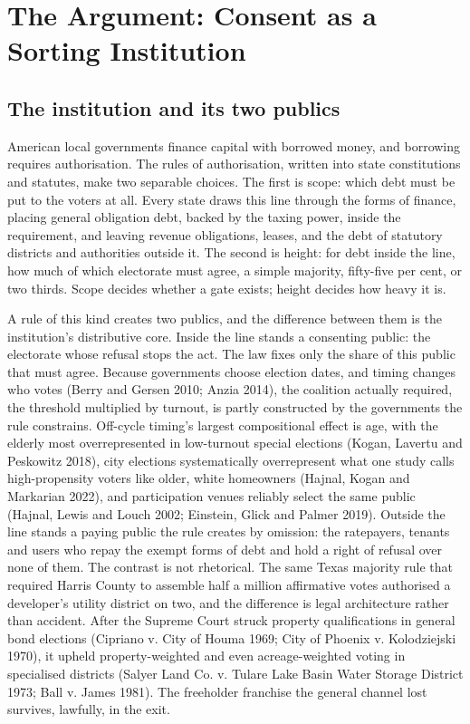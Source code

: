 \section{The Argument: Consent as a Sorting Institution}
\subsection{The institution and its two publics}
American local governments finance capital with borrowed money, and borrowing requires authorisation. The rules of authorisation, written into state constitutions and statutes, make two separable choices. The first is scope: which debt must be put to the voters at all. Every state draws this line through the forms of finance, placing general obligation debt, backed by the taxing power, inside the requirement, and leaving revenue obligations, leases, and the debt of statutory districts and authorities outside it. The second is height: for debt inside the line, how much of which electorate must agree, a simple majority, fifty-five per cent, or two thirds. Scope decides whether a gate exists; height decides how heavy it is.

A rule of this kind creates two publics, and the difference between them is the institution's distributive core. Inside the line stands a consenting public: the electorate whose refusal stops the act. The law fixes only the share of this public that must agree. Because governments choose election dates, and timing changes who votes (Berry and Gersen 2010; Anzia 2014), the coalition actually required, the threshold multiplied by turnout, is partly constructed by the governments the rule constrains. Off-cycle timing's largest compositional effect is age, with the elderly most overrepresented in low-turnout special elections (Kogan, Lavertu and Peskowitz 2018), city elections systematically overrepresent what one study calls high-propensity voters like older, white homeowners (Hajnal, Kogan and Markarian 2022), and participation venues reliably select the same public (Hajnal, Lewis and Louch 2002; Einstein, Glick and Palmer 2019). Outside the line stands a paying public the rule creates by omission: the ratepayers, tenants and users who repay the exempt forms of debt and hold a right of refusal over none of them. The contrast is not rhetorical. The same Texas majority rule that required Harris County to assemble half a million affirmative votes authorised a developer's utility district on two, and the difference is legal architecture rather than accident. After the Supreme Court struck property qualifications in general bond elections (Cipriano v. City of Houma 1969; City of Phoenix v. Kolodziejski 1970), it upheld property-weighted and even acreage-weighted voting in specialised districts (Salyer Land Co. v. Tulare Lake Basin Water Storage District 1973; Ball v. James 1981). The freeholder franchise the general channel lost survives, lawfully, in the exit.


